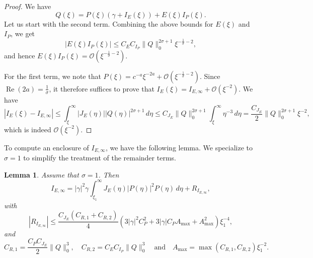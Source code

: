 \documentclass[11pt]{article}
\DeclareMathOperator{\real}{Re}
\newtheorem{lemma}[definition]{Lemma}
\begin{document}
\begin{proof}
  We have
  \begin{equation*}
    Q(\xi) = P(\xi)(\gamma + I_{E}(\xi)) + E(\xi)I_{P}(\xi).
  \end{equation*}
  Let us start with the second term. Combining the above bounds for
  \(E(\xi)\) and \(I_{P}\), we get
  \begin{equation*}
    |E(\xi)I_{P}(\xi)| \leq C_{E}C_{I_{P}}\|Q\|_{0}^{2\sigma + 1}
    \xi^{-\frac{1}{\sigma} - 2},
  \end{equation*}
  and hence
  \(E(\xi)I_{P}(\xi) = \mathcal{O}(\xi^{-\frac{1}{\sigma} - 2})\).

  For the first term, we note that
  \(P(\xi) = c^{-a}\xi^{-2a} + \mathcal{O}(\xi^{-\frac{1}{\sigma} -
    2})\). Since \(\real(2a) = \frac{1}{\sigma}\), it therefore suffices
  to prove that \(I_{E}(\xi) = I_{E,\infty} + \mathcal{O}(\xi^{-2})\).
  We have
  \begin{equation*}
    |I_{E}(\xi) - I_{E,\infty}|
    \leq \int_{\xi}^{\infty}|J_{E}(\eta)||Q(\eta)|^{2\sigma + 1}\,d\eta
    \leq C_{J_{E}}\|Q\|_{0}^{2\sigma + 1}\int_{\xi}^{\infty}\eta^{-3}\,d\eta
    = \frac{C_{J_{E}}}{2}\|Q\|_{0}^{2\sigma + 1}\xi^{-2},
  \end{equation*}
  which is indeed \(\mathcal{O}(\xi^{-2})\).
\end{proof}

To compute an enclosure of \(I_{E,\infty}\), we have the following
lemma. We specialize to \(\sigma = 1\) to simplify the treatment
of the remainder terms.

\begin{lemma}\label{lemma:I_E_infty}
  Assume that \(\sigma = 1\). Then
  \begin{equation*}
    I_{E,\infty}
    = |\gamma|^{2}\gamma\int_{\xi_{1}}^{\infty} J_{E}(\eta)|P(\eta)|^{2}P(\eta)\,d\eta
    + R_{I_{E,\infty}},
  \end{equation*}
  with
  \begin{equation*}
    |R_{I_{E,\infty}}|
    \leq \frac{C_{J_{E}}(C_{R,1} + C_{R,2})}{4}
    \left(3|\gamma|^{2}C_{P}^{2} + 3|\gamma|C_{P}A_{\max} + A_{\max}^{2}\right)
    \xi_{1}^{-4},
  \end{equation*}
  and
  \begin{equation*}
    C_{R,1} = \frac{C_{P}C_{J_{E}}}{2}\|Q\|_{0}^{3},\quad
    C_{R,2} = C_{E}C_{I_{P}}\|Q\|_{0}^{3}\quad\text{and}\quad
    A_{\max} = \max(C_{R,1}, C_{R,2})\xi_{1}^{-2}.
  \end{equation*}
\end{lemma}
\end{document}
